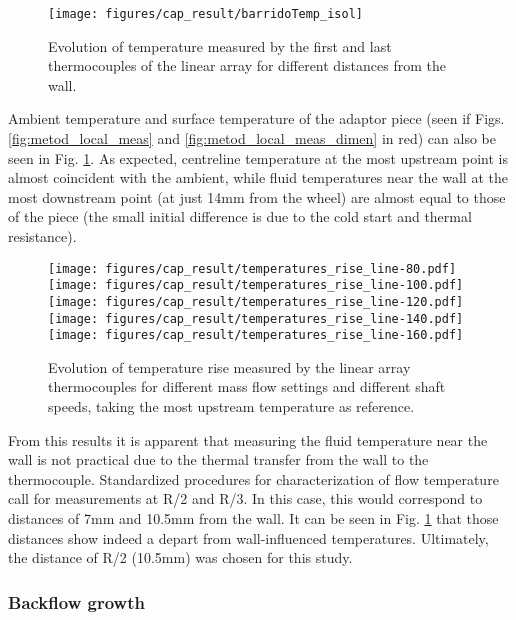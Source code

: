 \begin{figure}[tb!]
\centering
\texttt{[image: figures/cap\_result/barridoTemp\_isol]}
\caption{Evolution of temperature measured by the first and last thermocouples of the linear array for different distances from the wall.}
\label{fig:barrido_temp}
\end{figure}

Ambient temperature and surface temperature of the adaptor piece (seen if Figs. \ref{fig:metod_local_meas} and \ref{fig:metod_local_meas_dimen} in red) can also be seen in Fig. \ref{fig:barrido_temp}. As expected, centreline temperature at the most upstream point is almost coincident with the ambient, while fluid temperatures near the wall at the most downstream point (at just 14mm from the wheel) are almost equal to those of the piece (the small initial difference is due to the cold start and thermal resistance).

\begin{figure}[htb!]%
\centering
\texttt{[image: figures/cap\_result/temperatures\_rise\_line-80.pdf]}
\texttt{[image: figures/cap\_result/temperatures\_rise\_line-100.pdf]}
\texttt{[image: figures/cap\_result/temperatures\_rise\_line-120.pdf]}
\texttt{[image: figures/cap\_result/temperatures\_rise\_line-140.pdf]}
\texttt{[image: figures/cap\_result/temperatures\_rise\_line-160.pdf]}
\caption{Evolution of temperature rise measured by the linear array thermocouples for different mass flow settings and different shaft speeds, taking the most upstream temperature as reference.}
\label{fig:temp_line_linear}
\end{figure}

From this results it is apparent that measuring the fluid temperature near the wall is not practical due to the thermal transfer from the wall to the thermocouple. Standardized procedures for characterization of flow temperature call for measurements at R/2 and R/3. In this case, this would correspond to distances of 7mm and 10.5mm from the wall. It can be seen in Fig. \ref{fig:barrido_temp} that those distances show indeed a depart from wall-influenced temperatures. Ultimately, the distance of R/2 (10.5mm) was chosen for this study.

\subsubsection{Backflow growth}

